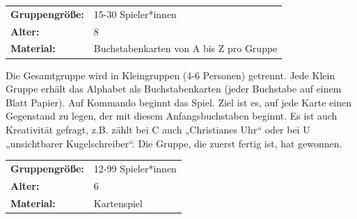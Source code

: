 \newpage


\begin{table}[H]
\begin{tabular}{>{\bfseries}lp{8cm}}
   Gruppengröße:   & 15-30 Spieler*innen\\
    Alter: & 8 \\
    Material: & Buchstabenkarten von A bis Z pro Gruppe \\ 
\end{tabular}
\end{table} 

 Die Gesamtgruppe wird in Kleingruppen (4-6 Personen) getrennt. Jede Klein Gruppe erhält das Alphabet als Buchstabenkarten (jeder Buchstabe auf einem Blatt Papier). Auf Kommando beginnt das Spiel. Ziel ist es, auf jede Karte einen Gegenstand zu legen, der mit diesem Anfangsbuchstaben beginnt. Es ist auch Kreativität gefragt, z.B. zählt bei C auch „Christianes Uhr“ oder bei U „unsichtbarer Kugelschreiber“. Die Gruppe, die zuerst fertig ist, hat gewonnen. \\




\begin{table}[H]
\begin{tabular}{>{\bfseries}lp{8cm}}
   Gruppengröße:   & 12-99 Spieler*innen\\
    Alter: & 6 \\
    Material: & Kartenspiel \\
\end{tabular}
\end{table} 

